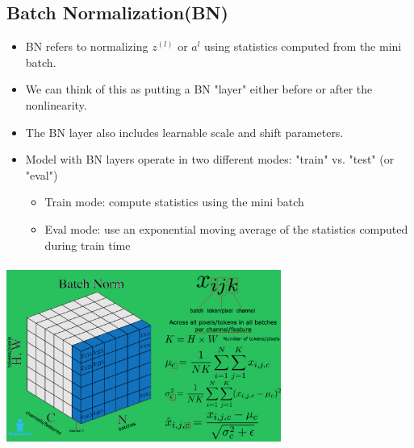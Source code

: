 \documentclass{article}
\begin{document}
\subsection{Batch Normalization(BN)}
\begin{itemize}
    \item BN refers to normalizing $z^{(l)}$ or $a^{l}$ using statistics computed from the mini batch.
    \item We can think of this as putting a BN "layer" either before or after the nonlinearity.
    \item The BN layer also includes learnable scale and shift parameters.
    \item Model with BN layers operate in two different modes: "train" vs. "test" (or "eval")
    \begin{itemize}
        \item Train mode: compute statistics using the mini batch
        \item Eval mode: use an exponential moving average of the statistics computed during train time
    \end{itemize}
\end{itemize}
\begin{center}
    \includegraphics[width=9cm, height=6cm]{Topics/IMAGES/illustrated_batch_norm.png} 
\end{center}

\end{document}
